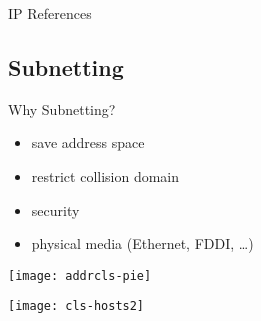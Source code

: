 \begin{frame}{IP References}
  \begin{refsection}
    \nocite{wiki:ip, wiki:ipaddr, rfc791, wiki:ipv4hdrchksum} \printbibliography[heading=none]
  \end{refsection}
\end{frame}




\subsection{Subnetting}

\begin{frame}{Why Subnetting?}
  \begin{minipage}{.4\linewidth}
    \begin{itemize}
    \item save address space
    \item restrict collision domain
    \item security
    \item physical media (Ethernet, FDDI, \ldots)
    \end{itemize}
    \texttt{[image: addrcls-pie]}
  \end{minipage}\hfill
  \begin{minipage}{.55\linewidth}
    \texttt{[image: cls-hosts2]}
  \end{minipage}
\end{frame}

